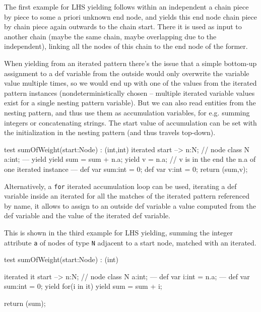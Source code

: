 The first example for LHS yielding follows within an independent a chain piece by piece to some a priori unknown end node, and yields this end node chain piece by chain piece again outwards to the chain start. There it is used as input to another chain (maybe the same chain, maybe overlapping due to the independent), linking all the nodes of this chain to the end node of the former.

When yielding from an iterated pattern there's the issue that a simple bottom-up assignment to a def variable from the outside would only overwrite the variable value multiple times, so we would end up with one of the values from the iterated pattern instances (nondeterministically chosen -- multiple iterated variable values exist for a single nesting pattern variable).
But we can also read entities from the nesting pattern, and thus use them as accumulation variables, for e.g. summing integers or concatenating strings.
The start value of accumulation can be set with the initialization in the nesting pattern (and thus travels top-down).

\begin{example}
  \begin{grgen}
test sumOfWeight(start:Node) : (int,int)
{
  iterated {
    start --> n:N; // node class N { a:int; }
  ---
    yield {
      yield sum = sum + n.a;
      yield v = n.a; // v is in the end the n.a of one iterated instance
    }
  } 
---
  def var sum:int = 0;
  def var v:int = 0;
  return (sum,v);
}
  \end{grgen}
\end{example}

Alternatively, a \texttt{for} iterated accumulation loop can be used, iterating a def variable inside an iterated for all the matches of the iterated pattern referenced by name, it allows to assign to an outside def variable a value computed from the def variable and the value of the iterated def variable.

This is shown in the third example for LHS yielding, summing the integer attribute \texttt{a} of nodes of type \texttt{N} adjacent to a start node, matched with an iterated.

\begin{example}
  \begin{grgen}
test sumOfWeight(start:Node) : (int)
{
  iterated it {
    start --> n:N; // node class N { a:int; }
  ---
    def var i:int = n.a;
  } 
---
  def var sum:int = 0;
  yield {
    for(i in it)
    {
      yield sum = sum + i;
    }
  }

  return (sum);
}
  \end{grgen}
\end{example}

